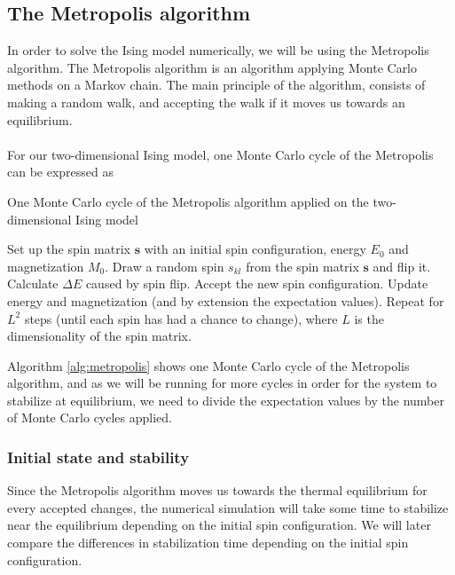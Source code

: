 \documentclass{article}
\begin{document}
\subsection{The Metropolis algorithm}
In order to solve the Ising model numerically, we will be using the Metropolis algorithm. The Metropolis algorithm is an algorithm applying Monte Carlo methods on a Markov chain. The main principle of the algorithm, consists of making a random walk, and accepting the walk if it moves us towards an equilibrium. \\\\
For our two-dimensional Ising model, one Monte Carlo cycle of the Metropolis can be expressed as
\begin{algorithm}[H]
\caption{One Monte Carlo cycle of the Metropolis algorithm applied on the two-dimensional Ising model}
\begin{algorithmic}[1]
\State Set up the spin matrix $\mathbf{s}$ with an initial spin configuration, energy $E_0$ and magnetization $M_0$.
\State Draw a random spin $s_{kl}$ from the spin matrix $\mathbf{s}$ and flip it.
\State Calculate $\Delta E$ caused by spin flip.
\State Accept the new spin configuration.
\EndIf
\State Update energy and magnetization (and by extension the expectation values).
\State Repeat for $L^2$ steps (until each spin has had a chance to change), where $L$ is the dimensionality of the spin matrix.
\end{algorithmic}
\label{alg:metropolis}
\end{algorithm}
Algorithm \ref{alg:metropolis} shows one Monte Carlo cycle of the Metropolis algorithm, and as we will be running for more cycles in order for the system to stabilize at equilibrium, we need to divide the expectation values by the number of Monte Carlo cycles applied.

\subsubsection{Initial state and stability}
Since the Metropolis algorithm moves us towards the thermal equilibrium for every accepted changes, the numerical simulation will take some time to stabilize near the equilibrium depending on the initial spin configuration. We will later compare the differences in stabilization time depending on the initial spin configuration.
\end{document}
